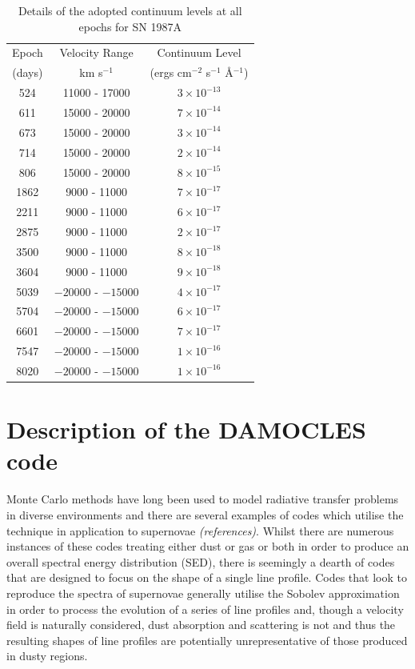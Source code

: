 \documentclass[useAMS,usenatbib,usegraphicx]{mnras}
\begin{document}
\begin{table}
	\caption{Details of the adopted continuum levels at all epochs for SN 1987A}
	\label{tb:continuum}
  	\begin{tabular}{@{} ccc @{}}
    	\hline
Epoch & Velocity Range & Continuum Level  \\
(days) & km s$^{-1}$ & (ergs cm$^{-2}$ s$^{-1}$ \AA $^{-1}$) \\
	\hline
524 & 11000 - 17000 & $3 \times 10^{-13}$ \\
611 & 15000 - 20000 & $7 \times 10^{-14}$ \\
673 & 15000 - 20000 & $3 \times 10^{-14}$ \\
714 & 15000 - 20000 & $2 \times 10^{-14}$ \\
806 & 15000 - 20000 & $8 \times 10^{-15}$ \\
1862 & 9000 - 11000 & $7 \times 10^{-17}$ \\
2211 & 9000 - 11000 & $6 \times 10^{-17}$ \\
2875 & 9000 - 11000 & $2 \times 10^{-17}$ \\
3500 & 9000 - 11000 & $8 \times 10^{-18}$ \\
3604 & 9000 - 11000 & $9 \times 10^{-18}$ \\
5039 & $-20000$ - $-15000$ & $4 \times 10^{-17}$ \\
5704 & $-20000$ - $-15000$ & $6 \times 10^{-17}$ \\
6601 & $-20000$ - $-15000$ & $7 \times 10^{-17}$ \\
7547 & $-20000$ - $-15000$ & $1 \times 10^{-16}$ \\
8020 & $-20000$ - $-15000$ & $1 \times 10^{-16}$ \\

    \hline
  \end{tabular}
\end{table}

\section{Description of the DAMOCLES code}
\label{code}
Monte Carlo methods have long been used to model radiative transfer problems in diverse environments and there are several examples of codes which utilise the technique in application to supernovae \textit{(references)}.  Whilst there are numerous instances of these codes treating either dust or gas or both in order to produce an overall spectral energy distribution (SED), there is seemingly a dearth of codes that are designed to focus on the shape of a single line profile.  Codes that look to reproduce the spectra of supernovae generally utilise the Sobolev approximation in order to process the evolution of a series of line profiles and, though a velocity field is naturally considered, dust absorption and scattering is not and thus the resulting shapes of line profiles are potentially unrepresentative of those produced in dusty regions.
\end{document}

